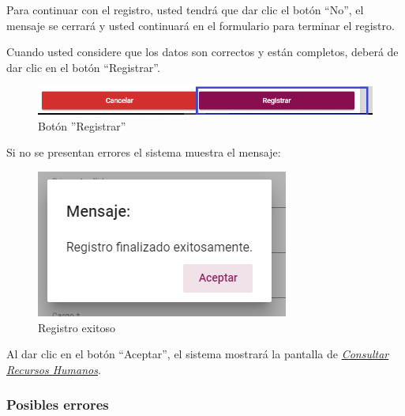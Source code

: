             Para continuar con el registro, usted tendrá que  dar clic el botón “No”, el mensaje se cerrará y usted continuará en el formulario para terminar el registro.

            Cuando usted considere que los datos son correctos y están completos, deberá de dar clic en el botón “Registrar”.

            \begin{figure}[H]
                \centering
                \hypertarget{btnreg}{\includegraphics[width=0.7\linewidth]{images/SP1/BtnRegistrar}}
                \caption{Botón ''Registrar''}
                \label{btnreg}
            \end{figure}

            Si no se presentan errores el sistema muestra el mensaje:


             \begin{figure}[H]
                \centering
            \includegraphics[width=0.4\linewidth]{images/SP1/MSG5}
                \caption{Registro exitoso}
                \label{mensaje5}

            \end{figure}

            Al dar clic en el botón “Aceptar”, el sistema mostrará la pantalla de  \hyperlink{consultarRH}{\textit{Consultar Recursos Humanos}}.

            \subsubsection{Posibles errores}

